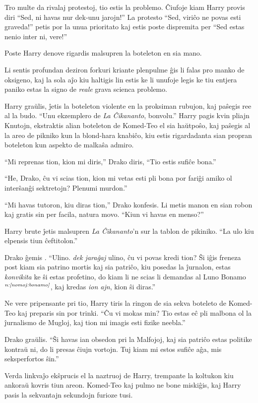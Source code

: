 Tro multe da rivalaj protestoj, tio estis la problemo. Ĉiufoje kiam
Harry provis diri ``Sed, ni havas nur dek-unu jarojn!'' La protesto
``Sed, viriĉo ne povas esti graveda!'' petis por la unua prioritato
kaj estis poste dispremita per ``Sed estas nenio inter ni, vere!''


Poste Harry denove rigardis malsupren la boteleton en sia mano.

Li sentis profundan deziron forkuri kriante plenpulme ĝis li falas
pro manko de oksigeno, kaj la sola aĵo kiu haltigis lin estis ke li
unufoje legis ke tiu entjera paniko estas la signo de \emph{reale} grava
scienca problemo.

Harry graŭlis, ĵetis la boteleton violente en la proksiman rubujon, kaj
paŝegis ree al la budo. ``Unu ekzemplero de \emph{La Ĉikananto},
bonvolu.'' Harry pagis kvin pliajn Knutojn, ekstraktis alian boteleton de
Komed-Teo el sia haŭtpoŝo, kaj paŝegis al la areo de pikniko kun
la blond-hara knabiĉo, kiu estis rigardadanta sian propran boteleton kun
aspekto de malkaŝa admiro.

``Mi reprenas tion, kion mi diris,'' Drako diris, ``Tio estis sufiĉe bona.''

``He, Drako, ĉu vi scias tion, kion mi vetas esti pli bona por fariĝi
amiko ol interŝanĝi sektretojn? Plenumi murdon.''

``Mi havas tutoron, kiu diras tion,'' Drako konfesis. Li metis manon
en sian robon kaj gratis sin per facila, natura movo. ``Kiun vi havas
en menso?''

Harry brute ĵetis malsupren \emph{La Ĉikananto}'n sur la tablon de
pikiniko. ``La ulo kiu elpensis tiun ĉeftitolon.''

Drako ĝemis . ``Ulino. \emph{dek jaraĝaj} ulino, ĉu vi povas kredi
tion? Ŝi iĝis freneza post kiam sia patrino mortis kaj sia patriĉo,
kiu posedas la ĵurnalon, estas \emph{konvikita} ke ŝi estas profetino,
do kiam li ne scias li demandas al Luno Bonamo$^{\textit{n:\ref{nomoj:bonamo}}}$,
kaj kredas \emph{ion ajn}, kion ŝi diras.''

Ne vere pripensante pri tio, Harry tiris la ringon de sia sekva
boteleto de Komed-Teo kaj preparis sin por trinki. ``Ĉu vi mokas
min?  Tio estas eĉ pli malbona ol la ĵurnalismo de Mugloj, kaj tion mi
imagis esti fizike neebla.''

Drako graŭlis. ``Ŝi havas ian obsedon pri la Malfojoj, kaj sia patriĉo
estas politike kontraŭ ni, do li presas ĉiujn vortojn. Tuj kiam mi
estos sufiĉe aĝa, mis seksperfortos ŝin.''

Verda linkvaĵo ekŝprucis el la naztruoj de Harry, trempante la
koltukon kiu ankoraŭ kovris tiun areon.  Komed-Teo kaj pulmo ne bone
miskiĝis, kaj Harry pasis la sekvantajn sekundojn furioze tusi.

